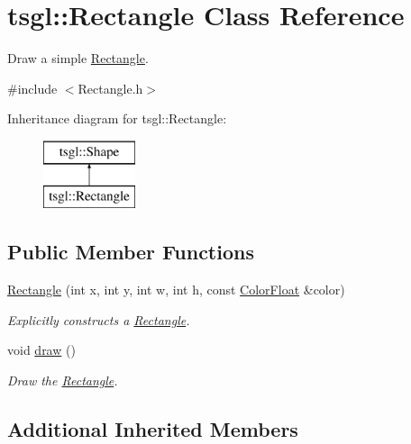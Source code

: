 \hypertarget{classtsgl_1_1_rectangle}{}\section{tsgl\+:\+:Rectangle Class Reference}
\label{classtsgl_1_1_rectangle}


Draw a simple \hyperlink{classtsgl_1_1_rectangle}{Rectangle}.  




{\ttfamily \#include $<$Rectangle.\+h$>$}

Inheritance diagram for tsgl\+:\+:Rectangle\+:\begin{figure}[H]
\begin{center}
\leavevmode
\includegraphics[height=2.000000cm]{classtsgl_1_1_rectangle}
\end{center}
\end{figure}
\subsection*{Public Member Functions}
\begin{DoxyCompactItemize}
\item 
\hyperlink{classtsgl_1_1_rectangle_a571dd054c2a10a55bd61fd7f43bc872d}{Rectangle} (int x, int y, int w, int h, const \hyperlink{structtsgl_1_1_color_float}{Color\+Float} \&color)
\begin{DoxyCompactList}\small\item\em Explicitly constructs a \hyperlink{classtsgl_1_1_rectangle}{Rectangle}. \end{DoxyCompactList}\item 
void \hyperlink{classtsgl_1_1_rectangle_addad1e65bc50d3669e6350aa32249c7f}{draw} ()
\begin{DoxyCompactList}\small\item\em Draw the \hyperlink{classtsgl_1_1_rectangle}{Rectangle}. \end{DoxyCompactList}\end{DoxyCompactItemize}
\subsection*{Additional Inherited Members}


